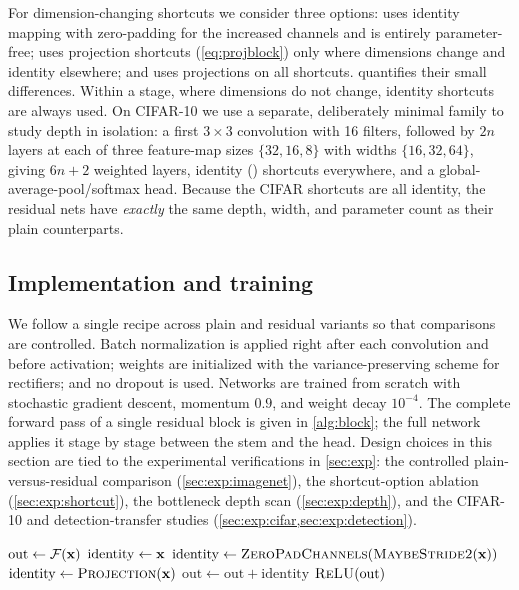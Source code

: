 For dimension-changing shortcuts we consider three options: \optA{} uses identity
mapping with zero-padding for the increased channels and is entirely parameter-free;
\optB{} uses projection shortcuts (\cref{eq:projblock}) only where dimensions change and
identity elsewhere; and \optC{} uses projections on all shortcuts. 
quantifies their small differences. Within a stage, where dimensions do not change,
identity shortcuts are always used. On CIFAR-10 we use a separate, deliberately minimal
family to study depth in isolation: a first $3\times3$ convolution with 16 filters,
followed by $2n$ layers at each of three feature-map sizes $\{32,16,8\}$ with widths
$\{16,32,64\}$, giving $6n{+}2$ weighted layers, identity (\optA) shortcuts everywhere,
and a global-average-pool/softmax head. Because the CIFAR shortcuts are all identity,
the residual nets have \emph{exactly} the same depth, width, and parameter count as their
plain counterparts.

\subsection{Implementation and training}
\label{sec:method:impl}
We follow a single recipe across plain and residual variants so that comparisons are
controlled. Batch normalization is applied right after each convolution and before
activation; weights are initialized with the variance-preserving scheme for
rectifiers; and no dropout is used. Networks are trained from scratch with stochastic
gradient descent, momentum $0.9$, and weight decay $10^{-4}$. The complete forward pass
of a single residual block is given in \cref{alg:block}; the full network applies it
stage by stage between the stem and the head. Design choices in this section are tied to
the experimental verifications in \cref{sec:exp}: the controlled plain-versus-residual
comparison (\cref{sec:exp:imagenet}), the shortcut-option ablation
(\cref{sec:exp:shortcut}), the bottleneck depth scan (\cref{sec:exp:depth}), and the
CIFAR-10 and detection-transfer studies (\cref{sec:exp:cifar,sec:exp:detection}).

\begin{algorithm}[t]
\caption{Forward pass of one residual building block}
\label{alg:block}
\begin{algorithmic}[1]
  \State $\mathrm{out} \gets \mathcal{F}(\mathbf{x})$ 
    \State $\mathrm{identity} \gets \mathbf{x}$ 
    \State $\mathrm{identity} \gets \textsc{ZeroPadChannels}(\textsc{MaybeStride2}(\mathbf{x}))$
  \Else
    \State $\mathrm{identity} \gets \textsc{Projection}(\mathbf{x})$ 
  \EndIf
  \State $\mathrm{out} \gets \mathrm{out} + \mathrm{identity}$ 
  \State \Return $\textsc{ReLU}(\mathrm{out})$
\EndFunction
\end{algorithmic}
\end{algorithm}

